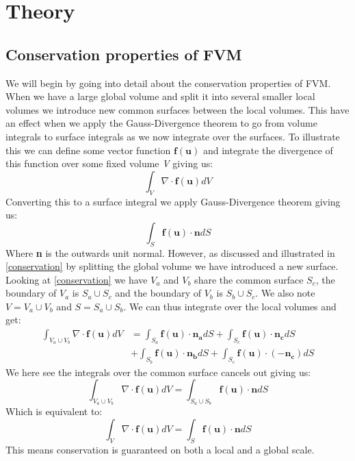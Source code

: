 \section{Theory}
\subsection{Conservation properties of FVM}
We will begin by going into detail about the conservation properties of FVM. When we have a large global volume and split it into several smaller local volumes we introduce new common surfaces between the local volumes. This have an effect when we apply the Gauss-Divergence theorem to go from volume integrals to surface integrals as we now integrate over the surfaces. To illustrate this we can define some vector function $\mathbf{f}(\mathbf{u})$ and integrate the divergence of this function over some fixed volume \textit{V} giving us:
\begin{equation*}
	\int_V \nabla\cdot\mathbf{f}(\mathbf{u})dV
\end{equation*}
Converting this to a surface integral we apply Gauss-Divergence theorem giving us:
\begin{equation*}
	\int_S \mathbf{f}(\mathbf{u})\cdot\mathbf{n}dS
\end{equation*}
Where \textbf{n} is the outwards unit normal. However, as discussed and illustrated in \autoref{conservation} by splitting the global volume we have introduced a new surface. Looking at  \autoref{conservation} we have $V_a$ and $V_b$ share the common surface $S_c$, the boundary of $V_a$ is $S_a \cup S_c$ and the boundary of $V_b$ is $S_b \cup S_c$. We also note $V = V_a \cup V_b$ and $S = S_a \cup S_b$. We can thus integrate over the local volumes and get:
\begin{align*}
	\int_{V_a\cup V_b}\nabla\cdot\mathbf{f}(\mathbf{u})dV &= \int_{S_a} \mathbf{f}(\mathbf{u})\cdot\mathbf{n_a}dS + \int_{S_c} \mathbf{f}(\mathbf{u})\cdot\mathbf{n_c}dS\\ 
	&+\int_{S_b} \mathbf{f}(\mathbf{u})\cdot\mathbf{n_b}dS + \int_{S_c} \mathbf{f}(\mathbf{u})\cdot(-\mathbf{n_c})dS
\end{align*}
We here see the integrals over the common surface cancels out giving us:
\begin{equation*}
	\int_{V_a\cup V_b}\nabla\cdot\mathbf{f}(\mathbf{u})dV = \int_{S_a\cup S_b} \mathbf{f}(\mathbf{u})\cdot\mathbf{n}dS
\end{equation*}
Which is equivalent to:
\begin{equation*}
	\int_V\nabla\cdot\mathbf{f}(\mathbf{u})dV = \int_S \mathbf{f}(\mathbf{u})\cdot\mathbf{n}dS
\end{equation*}
This means conservation is guaranteed on both a local and a global scale.

